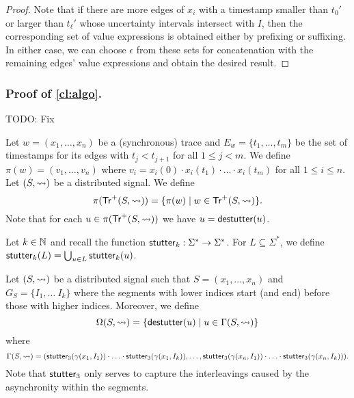 \begin{proof}
	Note that if there are more edges of $x_i$ with a timestamp smaller than $t_0'$ or larger than $t_\ell'$ whose uncertainty intervals intersect with $I$, then the corresponding set of value expressions is obtained either by prefixing or suffixing.
	In either case, we can choose $\epsilon$ from these sets for concatenation with the remaining edges' value expressions and obtain the desired result.
\end{proof}

\subsubsection{Proof of \cref{cl:algo}.}

\alert{TODO: Fix}

Let $w = (x_1, \ldots, x_n)$ be a (synchronous) trace and $E_w = \{t_1, \ldots, t_m\}$ be the set of timestamps for its edges with $t_j < t_{j+1}$ for all $1 \leq j < m$.
We define $\pi(w) = (v_1, \ldots, v_n)$ where $v_i = x_i(0) \cdot x_i(t_1) \cdot \ldots \cdot x_i(t_m)$ for all $1 \leq i \leq n$.
Let $(S,{\rightsquigarrow})$ be a distributed signal.
We define
\[ \pi(\tr^+(S,{\hb})) = \{ \pi(w) \st w \in \tr^+(S,{\hb}) \}. \]
Note that for each $u \in \pi(\mathsf{Tr}^+(S,{\rightsquigarrow}))$ we have $u = \mathsf{destutter}(u)$.

Let $k \in \mathbb{N}$ and recall the function $\mathsf{stutter}_k : \Sigma^* \to \Sigma^*$.
For $L \subseteq \Sigma^*$, we define $\mathsf{stutter}_k(L) = \bigcup_{u \in L} \mathsf{stutter}_k(u)$.

Let $(S,{\rightsquigarrow})$ be a distributed signal such that $S = (x_1, \ldots, x_n)$ and $G_S = \{I_1, \ldots\ I_k\}$ where the segments with lower indices start (and end) before those with higher indices.
Moreover, we define 
\[ \Omega(S,{\hb}) = \{ \destutter(u) \st u \in \Gamma(S,{\hb}) \} \]
where
\[ \Gamma(S,{\rightsquigarrow}) = ( \mathsf{stutter}_3(\gamma(x_1, I_1)) \cdot \ldots \cdot \mathsf{stutter}_3(\gamma(x_1, I_k)), \ldots,  \mathsf{stutter}_3(\gamma(x_n, I_1)) \cdot \ldots \cdot \mathsf{stutter}_3(\gamma(x_n, I_k)) ). \]
Note that $\mathsf{stutter}_3$ only serves to capture the interleavings caused by the asynchronity within the segments.


